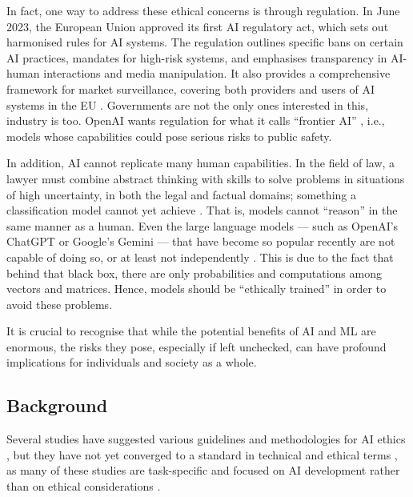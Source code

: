 \documentclass[fleqn,10pt]{wlscirep}
\begin{document}
In fact, one way to address these ethical concerns is through regulation. In June 2023, the European Union approved its first AI regulatory act, which sets out harmonised rules for AI systems. The regulation outlines specific bans on certain AI practices, mandates for high-risk systems, and emphasises transparency in AI-human interactions and media manipulation. It also provides a comprehensive framework for market surveillance, covering both providers and users of AI systems in the EU \cite{eu-52021PC0206}.  Governments are not the only ones interested in this, industry is too. OpenAI wants regulation for what it calls ``frontier AI'' \cite{anderljung2023frontier}, i.e., models whose capabilities could pose serious risks to public safety. 

In addition, AI cannot replicate many human capabilities. In the field of law, a lawyer must combine abstract thinking with skills to solve problems in situations of high uncertainty, in both the legal and factual domains; something a classification model cannot yet achieve \cite{surden2014machine}. That is, models cannot “reason” in the same manner as a human. Even the large language models — such as OpenAI's ChatGPT or Google's Gemini — that have become so popular recently are not capable of doing so, or at least not independently \cite{hao2023reasoning,wei2023chainofthought}. This is due to the fact that behind that black box, there are only probabilities and computations among vectors and matrices. Hence, models should be ``ethically trained'' in order to avoid these problems.

It is crucial to recognise that while the potential benefits of AI and ML are enormous, the risks they pose, especially if left unchecked, can have profound implications for individuals and society as a whole.

\subsection{Background}

Several studies have suggested various guidelines and methodologies for AI ethics \cite{Floridi2018,baron2019interpretable,Boddington_2017,Mittelstadt_2019,10.1145/3442188.3445919},  but they have not yet converged to a standard in technical and ethical terms \cite{Hagendorff2020,fjeld2020principled,Jobin2019,zeng2018linking},  as many of these studies are task-specific and focused on AI development rather than on ethical considerations \cite{Ayling2022,Morley2020}.
\end{document}
